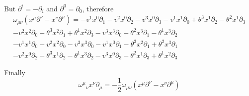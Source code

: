 \documentclass{article}
\begin{document}
But $\partial^i=-\partial_i$ and $\partial^0=\partial_0$, therefore
\begin{multline*}
\omega_{\mu\nu} (x^\mu \partial^\nu-x^\nu \partial^\mu)=
-v^1 x^0 \partial_1-v^2 x^0 \partial_2-v^3 x^0 \partial_3
-v^1 x^1 \partial_0+\theta^3 x^1 \partial_2-\theta^2 x^1 \partial_3\\ 
-v^2 x^2 \partial_0-\theta^3 x^2 \partial_1+\theta^1 x^2 \partial_3
-v^3 x^3 \partial_0+\theta^2 x^3 \partial_1-\theta^1 x^3 \partial_2\\
-v^1 x^1 \partial_0-v^2 x^2 \partial_0-v^3 x^3 \partial_0
-v^1 x^0 \partial_1-\theta^3 x^2 \partial_1+\theta^2 x^3 \partial_1\\ 
-v^2 x^0 \partial_2+\theta^3 x^1 \partial_2-\theta^1 x^3 \partial_2
-v^3 x^0 \partial_3-\theta^2 x^1 \partial_3+\theta^1 x^2 \partial_3\end{multline*}

Finally
\[{\omega^\mu}_\nu x^\nu \partial_\mu=-\frac{1}{2}\omega_{\mu\nu} (x^\mu \partial^\nu-x^\nu \partial^\mu)\]
\end{document}
